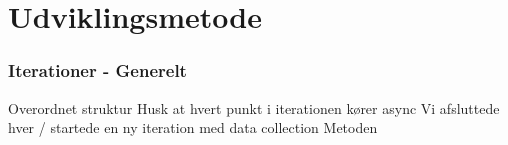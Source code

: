 \section{Udviklingsmetode}
\begin{frame}
  \frametitle{Iterationer - Generelt}
  Overordnet struktur
  Husk at hvert punkt i iterationen kører async
  Vi afsluttede hver / startede en ny iteration med data collection
  Metoden
\end{frame}
